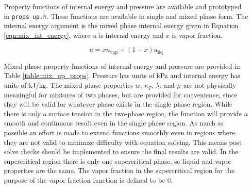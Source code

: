 \documentclass[oneside]{book}
\begin{document}
Property functions of internal energy and pressure are available and prototyped in \texttt{props\_up.h}.  These functions are available in single and mixed phase form.  The internal energy argument is the mixed phase internal energy given in Equation \ref{eqn:mix_int_energy}, where $u$ is internal energy and $x$ is vapor fraction. 

\begin{equation}\label{eqn:mix_int_energy}
	u = x u_{\text{vap}} + (1 - x) u_{\text{liq}}
\end{equation}

Mixed phase property functions of internal energy and pressure are provided in Table \ref{table:mix_up_props}. Pressure has units of kPa and internal energy has units of kJ/kg.  The mixed phase properties $w$, $\kappa_T$, $\lambda$, and $\mu$ are not physically meaningful for mixtures of two phases, but are provided for convenience, since they will be valid for whatever phase exists in the single phase region.  While there is only a surface tension in the two-phase region, the function will provide a smooth and continuous result even in the single phase region. As much as possible an effort is made to extend functions smoothly even in regions where they are not valid to minimize difficulty with equation solving.  This means post solve checks should be implemented to ensure the final results are valid.  In the supercritical region there is only one supercritical phase, so liquid and vapor properties are the same.  The vapor fraction in the supercritical region for the purpose of the vapor fraction function is defined to be 0.
\end{document}
